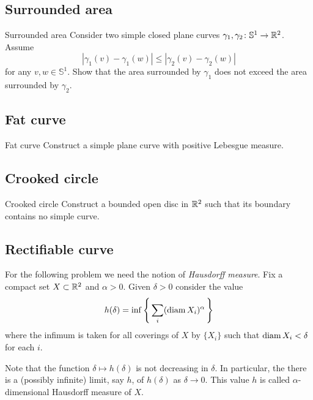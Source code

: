 \subsection*{Surrounded area}

\begin{pr}{\easy}{Surrounded area}\label{Surrounded area}
Consider two simple closed plane curves  
$\gamma_1,\gamma_2\colon\mathbb S^1\to\mathbb{R}^2$.
Assume 
\[|\gamma_1(v)-\gamma_1(w)|\le|\gamma_2(v)-\gamma_2(w)|\]
for any $v,w\in \mathbb S^1$.
Show that the area surrounded by $\gamma_1$ does not exceed the area surrounded by $\gamma_2$. 
\end{pr}

\subsection*{Fat curve}

\begin{pr}{\easy}{Fat curve}\label{Fat curve}
Construct a simple plane curve with positive Lebesgue measure.
\end{pr}


\subsection*{Crooked circle}

\begin{pr}{}{Crooked circle}\label{Crooked circle} 
Construct 
a bounded open disc in $\mathbb{R}^2$ 
such that 
its boundary contains no simple curve.
\end{pr}

\subsection*{Rectifiable curve}

For the following problem we need the notion of 
\emph{Hausdorff measure}.
Fix a compact set $X\subset\mathbb{R}^2$ and $\alpha>0$.
Given $\delta>0$ consider the value
\[h(\delta)=\inf\left\{\,\sum_i(\operatorname{\rm diam} X_i)^\alpha\,\right\}\]
where the infimum is taken for all coverings of $X$ by $\{X_i\}$
such that $\operatorname{\rm diam} X_i<\delta$ for each $i$.

Note that the function $\delta\mapsto h(\delta)$ is not decreasing in $\delta$.
In particular, the there is a (possibly infinite) limit, say $h$, of $h(\delta)$ as $\delta\to0$.
This value $h$ is called $\alpha$-dimensional Hausdorff measure of $X$.

